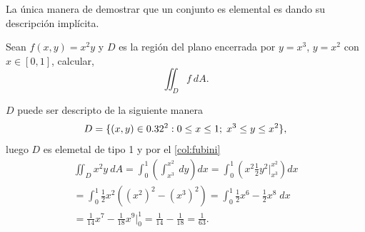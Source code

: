 \begin{obs} La \'unica manera de demostrar que un conjunto es elemental es dando su descripci\'on  impl\'icita.
\end{obs}


\begin{example}
     Sean $f(x,y)=x^2y$ y  $D$ es la regi\'on del plano encerrada por $y=x^3$, $y=x^2$  con $x\in[0,1]$,  calcular,  $$\iint_D f \:dA.$$  

    \begin{center}
    \end{center}

 $D$ puede ser descripto de la siguiente manera
    \[
        D=\{(x,y)\in0.32^2:0\leq x\leq1;\;x^3\leq y\leq x^2\},  
    \]
 luego $D$ es elemetal de tipo 1 y  por el \autoref{col:fubini}
    \begin{gather*}
        \iint_D x^2y\:dA=\int_0^1\left(\int_{x^3}^{x^2}\:dy\right)dx=\int_0^1\left(x^2\frac{1}{2}y^2\Big\lvert_{x^3}^{x^2}\right)dx\\
        =\int_0^1\frac{1}{2}x^2\left((x^2)^2-(x^3)^2\right)=\int_0^1\frac{1}{2}x^6-\frac{1}{2}x^8\;dx\\=\frac{1}{14}x^7-\frac{1}{18}x^9\Big\lvert_0^1=\frac{1}{14}-\frac{1}{18}=\frac{1}{63}.
    \end{gather*}
\end{example}

